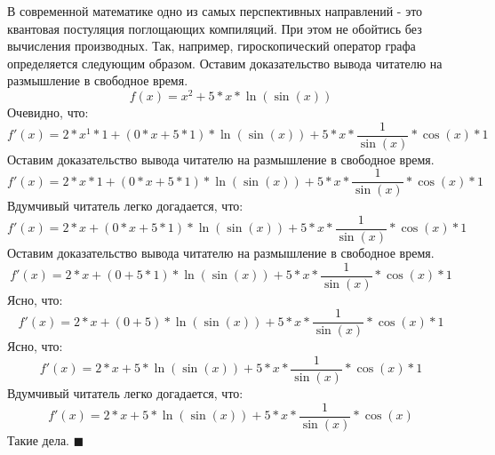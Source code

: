 \documentclass{article}
\begin{document}
 

В современной математике одно из самых перспективных направлений - это квантовая постуляция поглощающих компиляций. При этом не обойтись без вычисления производных. Так, например, гироскопический оператор графа определяется следующим образом.
Оставим доказательство вывода читателю на размышление в свободное время.
\begin{equation*}
f(x) = {{x}^{2}} + {{{5} * {x}} * {\ln\left({\sin\left({x}\right)}\right)}}
\end{equation*}
Очевидно, что:
\begin{equation*}
f'(x) = {{{2} * {{x}^{1}}} * {1}} + {{{\left({{0} * {x}} + {{5} * {1}}\right)} * {\ln\left({\sin\left({x}\right)}\right)}} + {{{5} * {x}} * {{\frac{1}{\sin\left({x}\right)}} * {{\cos\left({x}\right)} * {1}}}}}
\end{equation*}
Оставим доказательство вывода читателю на размышление в свободное время.
\begin{equation*}
f'(x) = {{{2} * {x}} * {1}} + {{{\left({{0} * {x}} + {{5} * {1}}\right)} * {\ln\left({\sin\left({x}\right)}\right)}} + {{{5} * {x}} * {{\frac{1}{\sin\left({x}\right)}} * {{\cos\left({x}\right)} * {1}}}}}
\end{equation*}
Вдумчивый читатель легко догадается, что:
\begin{equation*}
f'(x) = {{2} * {x}} + {{{\left({{0} * {x}} + {{5} * {1}}\right)} * {\ln\left({\sin\left({x}\right)}\right)}} + {{{5} * {x}} * {{\frac{1}{\sin\left({x}\right)}} * {{\cos\left({x}\right)} * {1}}}}}
\end{equation*}
Оставим доказательство вывода читателю на размышление в свободное время.
\begin{equation*}
f'(x) = {{2} * {x}} + {{{\left({0} + {{5} * {1}}\right)} * {\ln\left({\sin\left({x}\right)}\right)}} + {{{5} * {x}} * {{\frac{1}{\sin\left({x}\right)}} * {{\cos\left({x}\right)} * {1}}}}}
\end{equation*}
Ясно, что:
\begin{equation*}
f'(x) = {{2} * {x}} + {{{\left({0} + {5}\right)} * {\ln\left({\sin\left({x}\right)}\right)}} + {{{5} * {x}} * {{\frac{1}{\sin\left({x}\right)}} * {{\cos\left({x}\right)} * {1}}}}}
\end{equation*}
Ясно, что:
\begin{equation*}
f'(x) = {{2} * {x}} + {{{5} * {\ln\left({\sin\left({x}\right)}\right)}} + {{{5} * {x}} * {{\frac{1}{\sin\left({x}\right)}} * {{\cos\left({x}\right)} * {1}}}}}
\end{equation*}
Вдумчивый читатель легко догадается, что:
\begin{equation*}
f'(x) = {{2} * {x}} + {{{5} * {\ln\left({\sin\left({x}\right)}\right)}} + {{{5} * {x}} * {{\frac{1}{\sin\left({x}\right)}} * {\cos\left({x}\right)}}}}
\end{equation*}
Такие дела. $\blacksquare$
\end{document}
